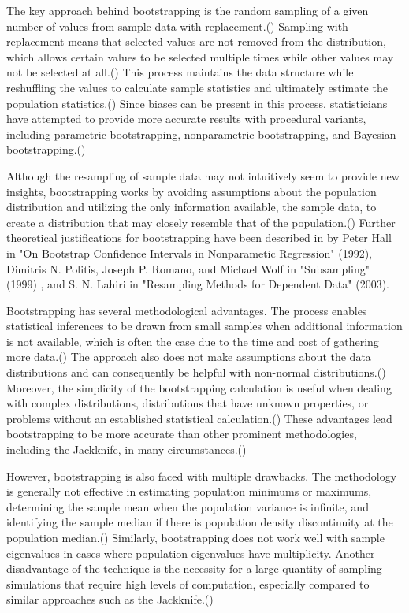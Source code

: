 \documentclass[11pt]{article}
\begin{document}
The key approach behind bootstrapping is the random sampling of a given number of values from sample data with replacement.(\cite{efron1982jackknife})
Sampling with replacement means that selected values are not removed from the distribution, which allows certain values to be
selected multiple times while other values may not be selected at all.(\cite{efron1982jackknife}) This process maintains the data structure while
reshuffling the values to calculate sample statistics and ultimately estimate the population statistics.(\cite{efron1982jackknife}) Since biases
can be present in this process, statisticians have attempted to provide more accurate results with procedural variants,
including parametric bootstrapping, nonparametric bootstrapping, and Bayesian bootstrapping.(\cite{efron2003})

\medskip

Although the resampling of sample data may not intuitively seem to provide new insights, bootstrapping works by avoiding
assumptions about the population distribution and utilizing the only information available, the sample data, to create a
distribution that may closely resemble that of the population.(\cite{efron2003}) Further theoretical justifications for bootstrapping have
been described in by Peter Hall in "On Bootstrap Confidence Intervals in Nonparametic Regression" (1992),
Dimitris N. Politis, Joseph P. Romano, and Michael Wolf in "Subsampling" (1999) , and S. N. Lahiri in "Resampling Methods for Dependent Data" (2003).

\medskip

Bootstrapping has several methodological advantages. The process enables statistical inferences to be drawn from small
samples when additional information is not available, which is often the case due to the time and cost of gathering more
data.(\cite{Singh_bootstrap}) The approach also does not make assumptions about the data distributions and can consequently be helpful with
non-normal distributions.(\cite{Singh_bootstrap}) Moreover, the simplicity of the bootstrapping calculation is useful when dealing with complex
distributions, distributions that have unknown properties, or problems without an established statistical calculation.(\cite{Singh_bootstrap})
These advantages lead bootstrapping to be more accurate than other prominent methodologies, including the Jackknife, in
many circumstances.(\cite{diciccio1996})

\medskip

However, bootstrapping is also faced with multiple drawbacks. The methodology is generally not effective in estimating
population minimums or maximums, determining the sample mean when the population variance is infinite, and identifying
the sample median if there is population density discontinuity at the population median.(\cite{Singh_bootstrap}) Similarly, bootstrapping does
not work well with sample eigenvalues in cases where population eigenvalues have multiplicity. Another disadvantage of
the technique is the necessity for a large quantity of sampling simulations that require high levels of computation,
especially compared to similar approaches such as the Jackknife.(\cite{diciccio1996})
\end{document}
